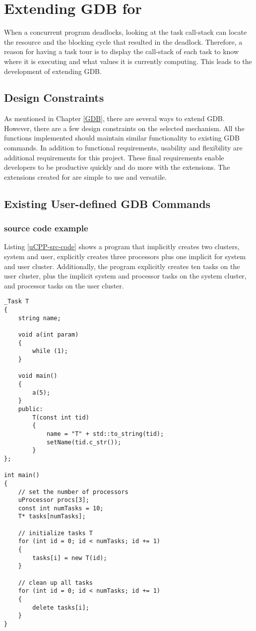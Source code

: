 \chapter{Extending GDB for \uCPP}
When a concurrent program deadlocks, looking at the task call-stack can locate
the resource and the blocking cycle that resulted in the deadlock. Therefore,
a reason for having a task tour is to display the call-stack of each task to
know where it is executing and what values it is currently computing. This leads
to the development of extending GDB.

\section{Design Constraints}
As mentioned in Chapter \ref{GDB}, there are several ways to extend GDB. However,
there are a few design constraints on the selected mechanism. All the functions
implemented should maintain similar functionality to existing GDB commands. In addition to functional
requirements, usability and flexibility are additional requirements for this
project. These final requirements enable developers to be productive quickly
and do more with the extensions. The extensions created for \uCPPS are simple
to use and versatile.

\section{Existing User-defined GDB Commands}
\subsection{\uCPPS source code example}
Listing \ref{uCPP-src-code} shows a \uCPPS program that implicitly creates two
clusters, system and user, explicitly creates three processors plus one
implicit for system and user cluster. Additionally, the program explicitly creates ten tasks on the
user cluster, plus the implicit system and processor tasks on the system cluster, and
processor tasks on the user cluster.

\begin{lstlisting}[caption={\uCPPS source code used for GDB commands},
label={uCPP-src-code}, basicstyle=\small]
_Task T
{
    string name;

    void a(int param)
    {
        while (1);
    }

    void main()
    {
        a(5);
    }
    public:
        T(const int tid)
        {
            name = "T" + std::to_string(tid);
            setName(tid.c_str());
        }
};

int main()
{
    // set the number of processors
    uProcessor procs[3];
    const int numTasks = 10;
    T* tasks[numTasks];

    // initialize tasks T
    for (int id = 0; id < numTasks; id += 1)
    {
        tasks[i] = new T(id);
    }

    // clean up all tasks
    for (int id = 0; id < numTasks; id += 1)
    {
        delete tasks[i];
    }
}
\end{lstlisting}

